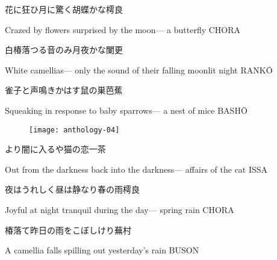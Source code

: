 \begin{haiku}
    {\FH 花に狂ひ月に驚く胡蝶かな}\hfill{\FH 樗良}

    \vin{} Crazed by flowers
    \vin{} \vin{} surprised by the moon---
    \vin{} \vin{} \vin{} a butterfly \hspace{\fill} CHORA
\end{haiku}

\begin{haiku}
    {\FH 白椿落つる音のみ月夜かな}\hfill{\FH 闌更}

    \vin{} White camellias---
    \vin{} \vin{} only the sound of their falling
    \vin{} \vin{} \vin{} moonlit night \hspace{\fill} RANK\={O}
\end{haiku}

\begin{haiku}
    {\FH 雀子と声鳴きかはす鼠の巣}\hfill{\FH 芭蕉}

    \vin{} Squeaking in response
    \vin{} \vin{} to baby sparrows---
    \vin{} \vin{} \vin{} a nest of mice \hspace{\fill} BASH\={O}
\end{haiku}

\begin{figure}
    \texttt{[image: anthology-04]}
\end{figure}

\begin{haiku}
    {\FH {}より闇に入るや猫の恋}\hfill{\FH 一茶}

    \vin{} Out from the darkness
    \vin{} \vin{} back into the darkness---
    \vin{} \vin{} \vin{} affairs of the cat \hspace{\fill} ISSA
\end{haiku}

\begin{haiku}
    {\FH 夜はうれしく昼は静なり春の雨}\hfill{\FH 樗良}

    \vin{} Joyful at night
    \vin{} \vin{} tranquil during the day---
    \vin{} \vin{} \vin{} spring rain \hspace{\fill} CHORA
\end{haiku}

\begin{haiku}
    {\FH 椿落て昨日の雨をこぼしけり}\hfill{\FH 蕪村}

    \vin{} A camellia falls
    \vin{} \vin{} spilling out
    \vin{} \vin{} \vin{} yesterday's rain \hspace{\fill} BUSON
\end{haiku}

